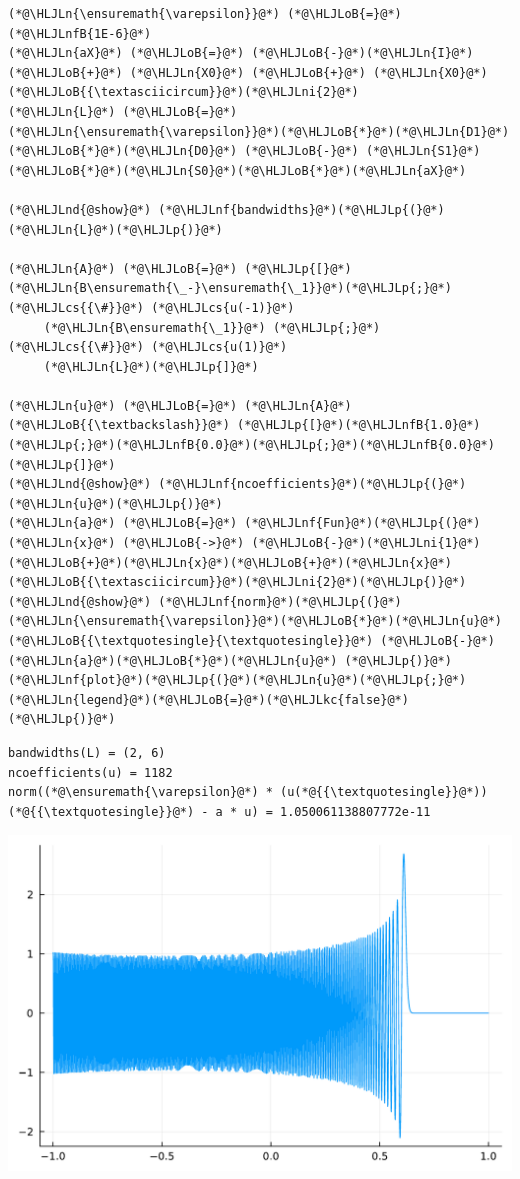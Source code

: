 \documentclass[12pt,a4paper]{article}
\newcommand{\HLJLkc}[1]{\textcolor[RGB]{59,151,46}{\textit{#1}}}
\newcommand{\HLJLn}[1]{#1}
\newcommand{\HLJLnd}[1]{\textcolor[RGB]{214,102,97}{#1}}
\newcommand{\HLJLnf}[1]{\textcolor[RGB]{66,102,213}{#1}}
\newcommand{\HLJLnfB}[1]{\textcolor[RGB]{59,151,46}{#1}}
\newcommand{\HLJLni}[1]{\textcolor[RGB]{59,151,46}{#1}}
\newcommand{\HLJLoB}[1]{\textcolor[RGB]{102,102,102}{\textbf{#1}}}
\newcommand{\HLJLp}[1]{#1}
\newcommand{\HLJLcs}[1]{\textcolor[RGB]{153,153,119}{\textit{#1}}}
\begin{document}
\begin{lstlisting}
(*@\HLJLn{\ensuremath{\varepsilon}}@*) (*@\HLJLoB{=}@*) (*@\HLJLnfB{1E-6}@*)
(*@\HLJLn{aX}@*) (*@\HLJLoB{=}@*) (*@\HLJLoB{-}@*)(*@\HLJLn{I}@*) (*@\HLJLoB{+}@*) (*@\HLJLn{X0}@*) (*@\HLJLoB{+}@*) (*@\HLJLn{X0}@*)(*@\HLJLoB{{\textasciicircum}}@*)(*@\HLJLni{2}@*)
(*@\HLJLn{L}@*) (*@\HLJLoB{=}@*) (*@\HLJLn{\ensuremath{\varepsilon}}@*)(*@\HLJLoB{*}@*)(*@\HLJLn{D1}@*)(*@\HLJLoB{*}@*)(*@\HLJLn{D0}@*) (*@\HLJLoB{-}@*) (*@\HLJLn{S1}@*)(*@\HLJLoB{*}@*)(*@\HLJLn{S0}@*)(*@\HLJLoB{*}@*)(*@\HLJLn{aX}@*)

(*@\HLJLnd{@show}@*) (*@\HLJLnf{bandwidths}@*)(*@\HLJLp{(}@*)(*@\HLJLn{L}@*)(*@\HLJLp{)}@*)

(*@\HLJLn{A}@*) (*@\HLJLoB{=}@*) (*@\HLJLp{[}@*)(*@\HLJLn{B\ensuremath{\_-}\ensuremath{\_1}}@*)(*@\HLJLp{;}@*)   (*@\HLJLcs{{\#}}@*) (*@\HLJLcs{u(-1)}@*)
     (*@\HLJLn{B\ensuremath{\_1}}@*) (*@\HLJLp{;}@*)   (*@\HLJLcs{{\#}}@*) (*@\HLJLcs{u(1)}@*)
     (*@\HLJLn{L}@*)(*@\HLJLp{]}@*)   

(*@\HLJLn{u}@*) (*@\HLJLoB{=}@*) (*@\HLJLn{A}@*) (*@\HLJLoB{{\textbackslash}}@*) (*@\HLJLp{[}@*)(*@\HLJLnfB{1.0}@*)(*@\HLJLp{;}@*)(*@\HLJLnfB{0.0}@*)(*@\HLJLp{;}@*)(*@\HLJLnfB{0.0}@*)(*@\HLJLp{]}@*)
(*@\HLJLnd{@show}@*) (*@\HLJLnf{ncoefficients}@*)(*@\HLJLp{(}@*)(*@\HLJLn{u}@*)(*@\HLJLp{)}@*)
(*@\HLJLn{a}@*) (*@\HLJLoB{=}@*) (*@\HLJLnf{Fun}@*)(*@\HLJLp{(}@*)(*@\HLJLn{x}@*) (*@\HLJLoB{->}@*) (*@\HLJLoB{-}@*)(*@\HLJLni{1}@*)(*@\HLJLoB{+}@*)(*@\HLJLn{x}@*)(*@\HLJLoB{+}@*)(*@\HLJLn{x}@*)(*@\HLJLoB{{\textasciicircum}}@*)(*@\HLJLni{2}@*)(*@\HLJLp{)}@*)
(*@\HLJLnd{@show}@*) (*@\HLJLnf{norm}@*)(*@\HLJLp{(}@*)(*@\HLJLn{\ensuremath{\varepsilon}}@*)(*@\HLJLoB{*}@*)(*@\HLJLn{u}@*)(*@\HLJLoB{{\textquotesingle}{\textquotesingle}}@*) (*@\HLJLoB{-}@*) (*@\HLJLn{a}@*)(*@\HLJLoB{*}@*)(*@\HLJLn{u}@*) (*@\HLJLp{)}@*)
(*@\HLJLnf{plot}@*)(*@\HLJLp{(}@*)(*@\HLJLn{u}@*)(*@\HLJLp{;}@*) (*@\HLJLn{legend}@*)(*@\HLJLoB{=}@*)(*@\HLJLkc{false}@*)(*@\HLJLp{)}@*)
\end{lstlisting}

\begin{lstlisting}
bandwidths(L) = (2, 6)
ncoefficients(u) = 1182
norm((*@\ensuremath{\varepsilon}@*) * (u(*@{{\textquotesingle}}@*))(*@{{\textquotesingle}}@*) - a * u) = 1.050061138807772e-11
\end{lstlisting}

\includegraphics[width=\linewidth]{jl_GsbqQZ/Chapter4_37_1.pdf}
\end{document}

